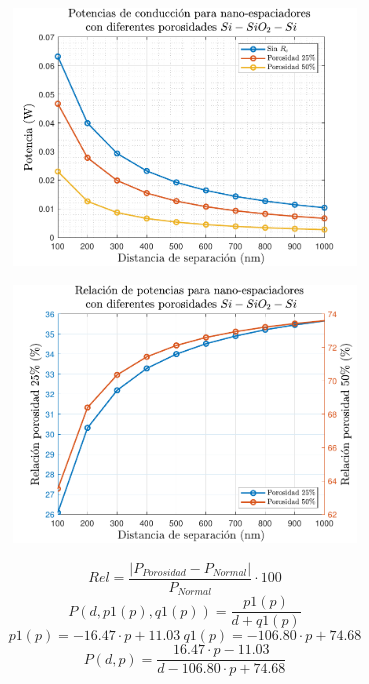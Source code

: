 \begin{figure}[H]
\begin{subfigure}[b]{0.49\textwidth}
		\caption{ }
		\label{fig:Prc2_SiSiO2Si}
	\end{subfigure}
	\begin{subfigure}[b]{0.49\textwidth}
		\centering
		\includegraphics[width=1.0\textwidth]{figuras/Resultados/conduccion/pdf/Ppor_SiSiO2Si.pdf}
		\caption{ }
		\label{fig:Ppor_SiSiO2Si}
	\end{subfigure}
	\begin{subfigure}[b]{0.49\textwidth}
		\centering
		\includegraphics[width=1.0\textwidth]{figuras/Resultados/conduccion/pdf/relPpor_SiSiO2Si.pdf}
		\caption{ }
		\label{fig:relPpor_SiSiO2Si}
	\end{subfigure}
	\caption{ }
	\label{fig:Pcond_SiSiO2Si}
\end{figure}
\[Rel=\frac{\left| P_{Porosidad}- P_{Normal} \right|}{P_{Normal}}\cdot 100\]
\[P(d,p1(p),q1(p))=\frac{p1(p)}{d+q1(p)}\]
\[p1(p)=-16.47\cdot p +11.03 \ q1(p)=-106.80\cdot p+74.68\]
\[P(d,p)=\frac{  16.47\cdot p-11.03 }{d-106.80\cdot p +74.68}\]
